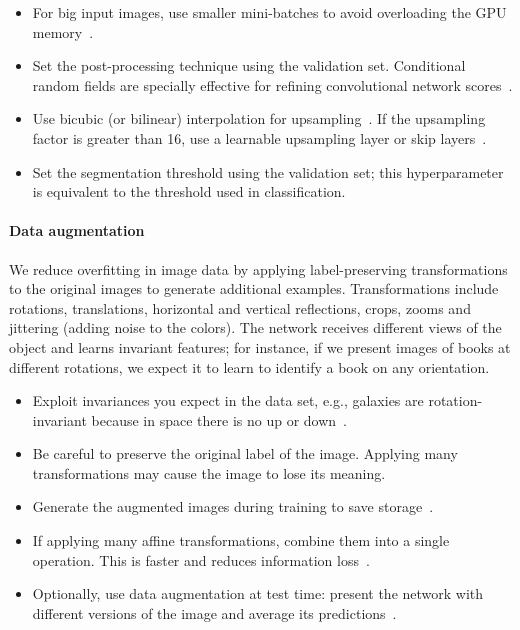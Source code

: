 \begin{itemize}
	\item For big input images, use smaller mini-batches to avoid overloading the GPU memory~\cite{Karpathy2016}.

	\item Set the post-processing technique using the validation set. Conditional random fields are specially effective for refining convolutional network scores~\cite{Chen2015}.

	\item Use bicubic (or bilinear) interpolation for upsampling~\cite{Chen2015}. If the upsampling factor is greater than 16, use a learnable upsampling layer or skip layers~\cite{Long2015}.

	\item Set the segmentation threshold using the validation set; this hyperparameter is equivalent to the threshold used in classification.
\end{itemize}

\paragraph{Data augmentation} We reduce overfitting in image data by applying label-preserving transformations to the original images to generate additional examples. Transformations include rotations, translations, horizontal and vertical reflections, crops, zooms and jittering (adding noise to the colors).  The network receives different views of the object and learns invariant features; for instance, if we present images of books at different rotations, we expect it to learn to identify a book on any orientation.

\begin{itemize}
	\item Exploit invariances you expect in the data set, e.g., galaxies are rotation-invariant because in space there is no up or down~\cite{Dieleman2015}.

	\item Be careful to preserve the original label of the image. Applying many transformations may cause the image to lose its meaning. 

	\item Generate the augmented images during training to save storage~\cite{Krizhevsky2012}.

	\item If applying many affine transformations, combine them into a single operation. This is faster and reduces information loss~\cite{Dieleman2015}.

	\item Optionally, use data augmentation at test time: present the network with different versions of the image and average its predictions~\cite{Krizhevsky2012}.
\end{itemize}

